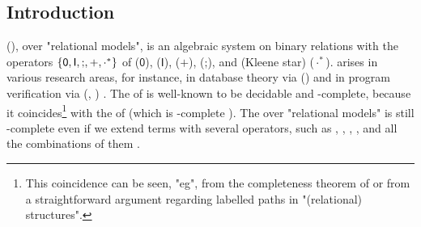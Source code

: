 \documentclass[10pt,a4paper]{article}
\theoremstyle{definition}
\theoremstyle{remark}
\DeclarePairedDelimiter\set{\{}{\}}
\newcommand{\const}[1]{\mathsf{#1}}
\newcommand{\bl}{\cdot}
\newcommand{\union}{\mathbin{+}}
\newcommand{\id}{\const{I}}
\newcommand{\emp}{\const{0}}
\newcommand{\compo}{\mathbin{;}}
\begin{document}
%
\begin{scope}

\section{Introduction} \label{section: introduction}
\AP
\intro*{} (\reintro*{}), \intro*{} over "relational models",
is an algebraic system on binary relations with the operators $\set{\emp, \id, \compo, \union, \bl^{*}}$ of
 ($\emp$),
 ($\id$),
 ($\union$),
 ($\compo$),
and  (Kleene star) ($\bl^{*}$).
 arises in various research areas,
for instance,
in database theory via \intro*{} () \cite{calvaneseRewritingRegularExpressions1999} and
in program verification via \intro*{} (\reintro*{}, \reintro*{}) \cite{kozenKleeneAlgebraTests1996}.
The  of  is well-known to be decidable and -complete,
because it coincides\footnote{\label{footnote: lang and REL equiv}%
This coincidence can be seen, "eg", from the completeness theorem of  \cite{kozenCompletenessTheoremKleene1994} or from a straightforward argument regarding labelled paths in "(relational) structures".} with the  of  (which is -complete \cite{meyerEquivalenceProblemRegular1972}).
The  over "relational models" is still -complete even if
we extend  terms with several operators,
such as
 \cite{kozenKleeneAlgebraTests1996},
 \cite{brunetKleeneAlgebraConverse2014},
 \cite{nakamuraExistentialCalculiRelations2023,pousCompletenessTheoremsKleene2024},
 \cite{nakamuraDerivativesGraphsPositive2025},
and all the combinations of them \cite[Cor.~6.7]{nakamuraDerivativesGraphsPositive2025}.


\end{scope}
\end{document}
